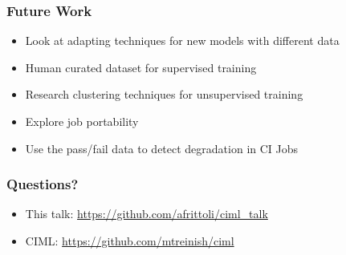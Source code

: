 \documentclass[aspectratio=169,11pt,hyperref={colorlinks=true}]{beamer}
\begin{document}
\begin{frame}
  \frametitle{Future Work}
  \begin{itemize}
      \item{Look at adapting techniques for new models with different data}
      \item{Human curated dataset for supervised training}
      \item{Research clustering techniques for unsupervised training}
      \item{Explore job portability}
      \item{Use the pass/fail data to detect degradation in CI Jobs}
  \end{itemize}
\end{frame}

\begin{frame}
  \frametitle{Questions?}
  \begin{itemize}
      \item{This talk: \href{https://github.com/afrittoli/ciml\_talk}{https://github.com/afrittoli/ciml\_talk}}
      \item{CIML: \href{https://github.com/mtreinish/ciml}{https://github.com/mtreinish/ciml}}
  \end{itemize}
\end{frame}
\end{document}
